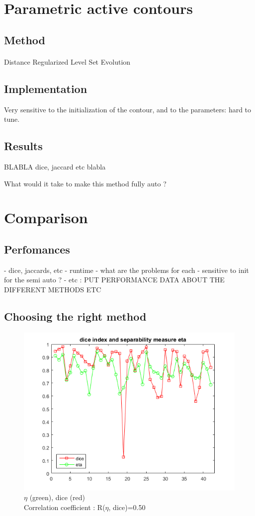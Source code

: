 \documentclass[a4paper,10pt]{article}
\begin{document}
\section{Parametric active contours}
\subsection{Method}
\paragraph{}  Distance Regularized Level Set Evolution \cite{li2010distance} 
\subsection{Implementation}
Very sensitive to the initialization of the contour, and to the parameters: hard to tune.

\subsection{Results}

BLABLA dice, jaccard etc
blabla

What would it take to make this method fully auto ?

\section{Comparison}

\subsection{Perfomances}
- dice, jaccards, etc
- runtime
- what are the problems for each
- sensitive to init for the semi auto ?
- etc : PUT PERFORMANCE DATA ABOUT THE DIFFERENT METHODS
ETC

\subsection{Choosing the right method}

\begin{figure}
	\centering
	\includegraphics[width=0.6\linewidth]{../results/selection-criterion/otsu-dice-jaccard-eta-plot}
	\caption{$\eta$ (green), dice (red)\\ Correlation coefficient : R($\eta$, dice)=0.50 }
	\label{fig:eta-correlation}
\end{figure}
\end{document}
